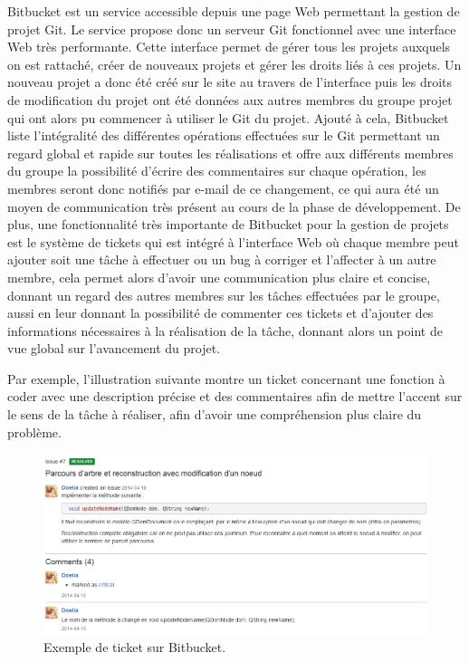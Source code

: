       Bitbucket est un service accessible depuis une page Web permettant la gestion de projet Git. Le service propose donc un serveur Git fonctionnel avec une interface Web très performante. Cette interface permet de gérer tous les projets auxquels on est rattaché, créer de nouveaux projets et gérer les droits liés à ces projets. Un nouveau projet a donc été créé sur le site au travers de l'interface puis les droits de modification du projet ont été données aux autres membres du groupe projet qui ont alors pu commencer à utiliser le Git du projet. Ajouté à cela, Bitbucket liste l'intégralité des différentes opérations effectuées sur le Git permettant un regard global et rapide sur toutes les réalisations et offre aux différents membres du groupe la possibilité d'écrire des commentaires sur chaque opération, les membres seront donc notifiés par e-mail de ce changement, ce qui aura été un moyen de communication très présent au cours de la phase de développement. De plus, une fonctionnalité très importante de Bitbucket pour la gestion de projets est le système de tickets qui est intégré à l'interface Web où chaque membre peut ajouter soit une tâche à effectuer ou un bug à corriger et l'affecter à un autre membre, cela permet alors d'avoir une communication plus claire et concise, donnant un regard des autres membres sur les tâches effectuées par le groupe, aussi en leur donnant la possibilité de commenter ces tickets et d'ajouter des informations nécessaires à la réalisation de la tâche, donnant alors un point de vue global sur l'avancement du projet.
       
       Par exemple, l'illustration suivante montre un ticket concernant une fonction à coder avec une description précise et des commentaires afin de mettre l'accent sur le sens de la tâche à réaliser, afin d'avoir une compréhension plus claire du problème.
       
\begin{figure}[ht!]
      \centering
      \includegraphics[scale=0.5]{images/bitbucket-exemple-issue.png}
      \caption[Exemple de ticket sur Bitbucket]{Exemple de ticket sur Bitbucket.}
\end{figure}

